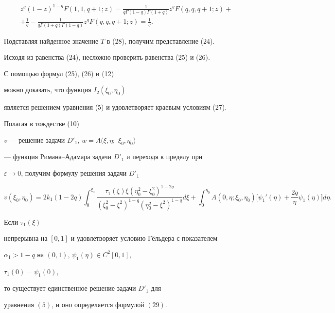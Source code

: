 \begin{pf}
\begin{gather*}
z^q (1-z)^{1-q} F(1,1,q+1;z)=


\frac{1}{q\Gamma(1-q)\Gamma(1+q)} z^q F(q,q,q+1;z)+\\


%


+\frac{1}{q}-\frac{1}{q\Gamma(1+q)\Gamma(1-q)} z^q


F(q,q,q+1;z)=\frac{1}{q}.


\end{gather*}


Подставляя найденное значение $T$ в (28), получим представление (24). 





Исходя из равенства (24), несложно проверить равенства (25) и (26).


С помощью формул (25), (26) и (12) 


можно доказать, что функция $I_2(\xi_0,\eta_0)$


является решением уравнения (5) и удовлетворяет краевым условиям (27). 


\end{pf}





Полагая в тождестве (10) 


$v$ --- решение задачи $D'_1$, $w=A(\xi,\eta;$ $\xi_0,\eta_0)$ 


--- функция Римана--Адамара задачи $D'_1$ и переходя к пределу при 


$\varepsilon \to 0$, получим формулу решения задачи $D'_1$    


\begin{equation}


v(\xi_0,\eta_0)=


2k_1(1-2q)\int_0^{\xi_0} \frac{\tau_1 (\xi) \xi (\eta_0^2-\xi_0^2)^{1-2q}}


{(\xi_0^2-\xi^2)^{1-q} (\eta_0^2-\xi^2)^{1-q} }d\xi+


\int_0^{\eta_0} A  (0,\eta;\xi_0,\eta_0) \bigg[\psi_1 '(\eta)


+\frac{2q}{\eta} \psi_1 (\eta) \bigg] d\eta.


\end{equation}





\begin{thm}


Если $\tau_1 (\xi)$


непрерывна на $[0,1]$ и удовлетворяет условию Г\"ельдера с показателем 


$\alpha_1>1-q$ на $(0,1)$, $\psi_1 (\eta)\in C^2[0,1]$,


$\tau_1 (0)=\psi_1 (0)$, 


то существует единственное решение задачи $D'_1$ для 


уравнения $(5)$, и оно определяется формулой $(29)$.


\end{thm}





